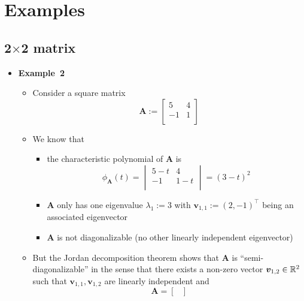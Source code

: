 \documentclass[12pt,a4paper]{article}
\begin{document}
\section{Examples}

\subsection{2$\times$2 matrix}

\begin{itemize}

\item \textbf{Example~2}
  \begin{itemize}
  \item Consider a square matrix
    \begin{equation}\nonumber%
      \bm{A} :=
      \begin{bmatrix}
        5 & 4 \\
        -1 & 1 \\
      \end{bmatrix}
    \end{equation}
  \item We know that
    \begin{itemize}
    \item the characteristic polynomial of $\bm{A}$ is
      \begin{equation}\nonumber%
        \phi_{\bm{A}}(t) =
        \begin{vmatrix}
          5 - t & 4 \\
          -1 & 1 - t \\
        \end{vmatrix}
        = (3-t)^{2}
      \end{equation}
    \item $\bm{A}$ only has one eigenvalue $\lambda_{1}:=3$
      with $\bm{v}_{1,1}:=(2, -1)^{\top}$ being an associated eigenvector
    \item $\bm{A}$ is not diagonalizable (no other linearly independent eigenvector)
    \end{itemize}
  \item But the Jordan decomposition theorem shows that
    $\bm{A}$ is ``semi-diagonalizable''
    in the sense that 
    there exists a non-zero vector $\bm{v}_{1,2}\in \mathbb{R}^{2}$ such that
    $\bm{v}_{1,1}, \bm{v}_{1,2}$ are linearly independent and
    \begin{equation}\nonumber%
      \bm{A} =
      \begin{bmatrix}

\end{bmatrix}
\end{equation}
\end{itemize}
\end{itemize}
\end{document}
